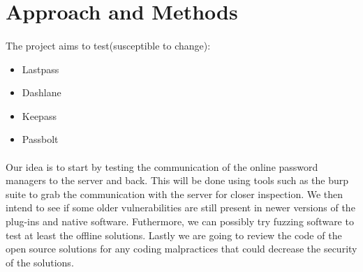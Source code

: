 \section{Approach and Methods}
\paragraph{}
The project aims to test(susceptible to change):
\begin{itemize}
    \item Lastpass
    \item Dashlane
    \item Keepass
    \item Passbolt
\end{itemize}

\paragraph{}
Our idea is to start by testing the communication of the online password managers to the server and back. This will be done using tools such as the burp suite to grab the communication with the server for closer inspection. We then intend to see if some older vulnerabilities are still present in newer versions of the plug-ins and native software. Futhermore, we can possibly try fuzzing software to test at least the offline solutions. Lastly we are going to review the code of the open source solutions for any coding malpractices that could decrease the security of the solutions.